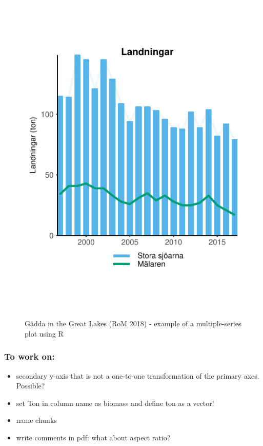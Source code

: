 \documentclass[]{article}
\begin{document}
\begin{figure}

{\centering \includegraphics{Making_figures_for_RoM_in_R_files/figure-latex/unnamed-chunk-26-1} 

}

\caption{Gädda in the Great Lakes (RoM 2018) - example of a multiple-series plot using R}\label{fig:unnamed-chunk-26}
\end{figure}

\subsubsection{To work on:}\label{to-work-on}

\begin{itemize}
\item
  secondary y-axis that is not a one-to-one transformation of the
  primary axes. Possible?
\item
  set Ton in column name as biomass and define ton as a vector!
\item
  name chunks
\item
  write comments in pdf: what about aspect ratio?
\end{itemize}
\end{document}
